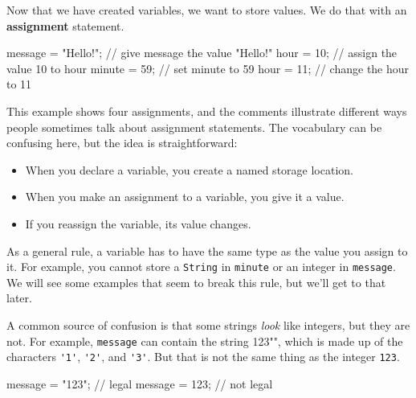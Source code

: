 \documentclass[12pt]{book}
\makeatletter
\theoremstyle{exercise}
\newcommand{\java}[1]{\verb"#1"}
\renewcommand\subsection{\@startsection{subsection}{2}{\z@}%
    {-3.25ex\@plus -1ex \@minus -.2ex}%
    {0.3ex \@plus .2ex}%
    {\normalfont\large\bfseries}}
\newcommand{\java}[1]{\lstinline{#1}} %
\makeatother
\begin{document}


Now that we have created variables, we want to store values.
We do that with an {\bf assignment} statement.

\begin{code}
    message = "Hello!";  // give message the value "Hello!"
    hour = 10;           // assign the value 10 to hour
    minute = 59;         // set minute to 59
    hour = 11;           // change the hour to 11
\end{code}

This example shows four assignments, and the comments illustrate different ways people sometimes talk about assignment statements.
The vocabulary can be confusing here, but the idea is straightforward:

\begin{itemize}
\item When you declare a variable, you create a named storage location.
\item When you make an assignment to a variable, you give it a value.
\item If you reassign the variable, its value changes.
\end{itemize}

As a general rule, a variable has to have the same type as the value you assign to it.
For example, you cannot store a \java{String} in \java{minute} or an integer in \java{message}.
We will see some examples that seem to break this rule, but we'll get to that later.


A common source of confusion is that some strings {\em look} like integers, but they are not.
For example, \java{message} can contain the string \java{"123"}, which is made up of the characters \java{'1'}, \java{'2'}, and \java{'3'}.
But that is not the same thing as the integer \java{123}.

\begin{code}
    message = "123";  // legal
    message = 123;    // not legal
\end{code}
\end{document}
